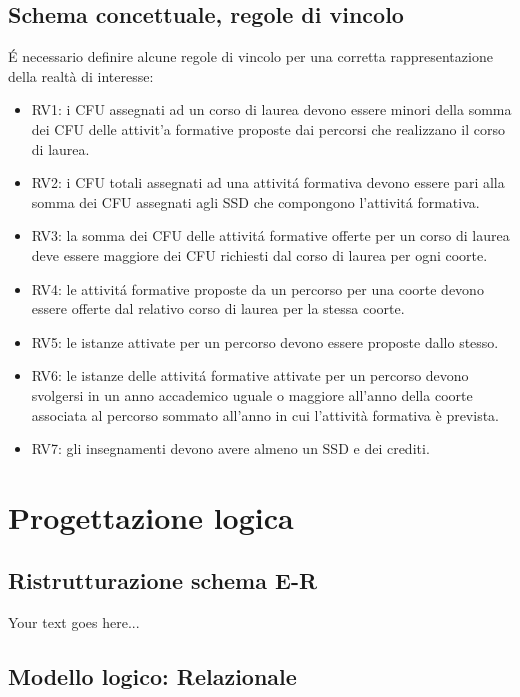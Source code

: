 \documentclass[a4paper,12pt,italian,towside]{article}
\begin{document}
\subsection{Schema concettuale, regole di vincolo}
\'E necessario definire alcune regole di vincolo per una corretta rappresentazione della realtà di interesse:
\begin{itemize}
	\item RV1: i CFU assegnati ad un corso di laurea devono essere minori della somma dei CFU delle attivit'a formative proposte dai percorsi che realizzano il corso di laurea.
	\item RV2: i CFU totali assegnati ad una attivit\'a formativa devono essere pari alla somma dei CFU assegnati agli SSD che compongono l'attivit\'a formativa.
	\item RV3: la somma dei CFU delle attivit\'a formative offerte per un corso di laurea deve essere maggiore dei CFU richiesti dal corso di laurea per ogni coorte.
	\item RV4: le attivit\'a formative proposte da un percorso per una coorte devono essere offerte dal relativo corso di laurea per la stessa coorte.
	\item RV5: le istanze attivate per un percorso devono essere proposte dallo stesso. 
	\item RV6: le istanze delle attivit\'a formative attivate per un percorso devono svolgersi in un anno accademico uguale o maggiore all'anno della coorte associata al percorso sommato all'anno in cui l'attività formativa è prevista.
	\item RV7: gli insegnamenti devono avere almeno un SSD e dei crediti.
\end{itemize}

\newpage
\section{Progettazione logica}

\subsection{Ristrutturazione schema E-R}

Your text goes here...

\newpage
\subsection{Modello logico: Relazionale}
\end{document}

